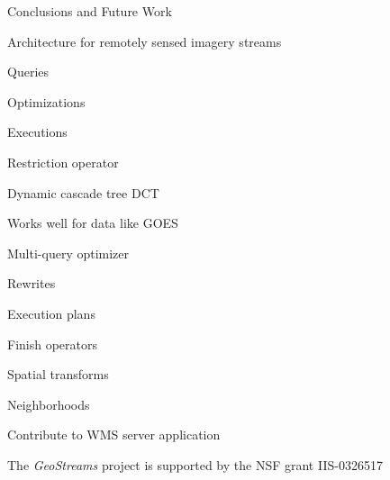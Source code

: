 \documentclass[final,total,bgColor,slideColor,pdf,ps2pdf,default,noaccumulate]{prosper}
\begin{document}
\begin{slide}[R]{Conclusions and Future Work}
  \begin{minipage}[t]{5.5cm}
    \raggedright
    \begin{Itemize}
    \item Architecture for remotely sensed imagery streams
      \begin{Itemize}
      \item Queries
      \item Optimizations
      \item Executions
      \end{Itemize}
    \item Restriction operator
      \begin{Itemize}
      \item Dynamic cascade tree DCT
      \item Works well for data like GOES
      \end{Itemize}
    \end{Itemize}
  \end{minipage}
  \begin{minipage}[t]{5.5cm}
    \raggedright
    \begin{Itemize}
    \item Multi-query optimizer
      \begin{Itemize}
      \item Rewrites
      \item Execution plans
      \end{Itemize}
    \item Finish operators
      \begin{Itemize}
      \item Spatial transforms
      \item Neighborhoods
      \end{Itemize}
    \item Contribute to WMS server application
    \end{Itemize}
  \end{minipage}

  \vspace*{0.5cm}

{\tiny The \emph{GeoStreams} project is supported by the NSF grant IIS-0326517}
\end{slide}
\end{document}
